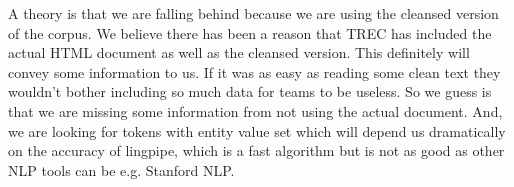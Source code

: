 A theory is that we are falling behind because we are using the cleansed version of the corpus. We believe there has been a reason that TREC has included the actual HTML document as well as the cleansed version. This definitely will convey some information to us. If it was as easy as reading some clean text they wouldn't bother including so much data for teams to be useless. So we guess is that we are missing some information from not using the actual document. And, we are looking for tokens with entity value set which will depend us dramatically on the accuracy of lingpipe, which is a fast algorithm but is not as good as other NLP tools can be e.g. Stanford NLP.



